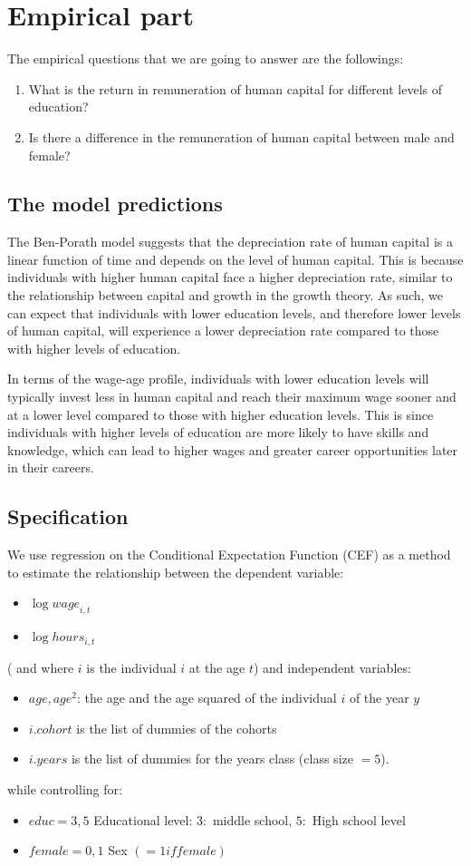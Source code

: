 \documentclass[12pt]{article}
\begin{document}
\section{Empirical part}
The empirical questions that we are going to answer are the followings:
\begin{enumerate}
    \item What is the return in remuneration of human capital for different levels of education?
    \item Is there a difference in the remuneration of human capital between male and female?
\end{enumerate}
\subsection{The model predictions}
The Ben-Porath model suggests that the depreciation rate of human capital is a linear function of time and depends on
the level of human capital. This is because individuals with higher human capital face a higher depreciation rate,
similar to the relationship between capital and growth in the growth theory. As such, we can expect that individuals
with lower education levels, and therefore lower levels of human capital, will experience a lower depreciation rate
compared to those with higher levels of education. \par
In terms of the wage-age profile, individuals with lower education levels will typically invest less in human capital
and reach their maximum wage sooner and at a lower level compared to those with higher education levels. This is since individuals with higher levels of education are more likely to have skills and knowledge, which can lead
to higher wages and greater career opportunities later in their careers.
\subsection{Specification}
We use regression on the Conditional Expectation Function (CEF) as a method to estimate the relationship between the
dependent variable:
\begin{itemize}
    \item $\log{wage}_{i,t}$
    \item $\log{hours}_{i,t}$
\end{itemize}
( and  where $i$ is the individual $i$ at the age $t$) and independent variables:
\begin{itemize}
    \item $age, age^2$: the age and the age squared of the individual $i$ of the year $y$
    \item $i.cohort$ is the list of dummies of the cohorts
    \item $i.years$ is the list of dummies for the years class (class size $=5$).
\end{itemize}
while controlling for:
\begin{itemize}
    \item $educ={3,5}$ Educational level: $3:$ middle school, $5:$ High school level
    \item $female={0,1}$  Sex $(=1 if female)$
\end{itemize}
\end{document}
